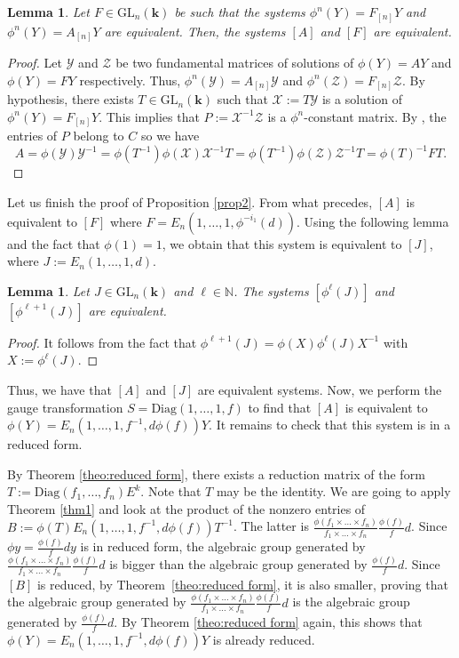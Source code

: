 \documentclass[a4paper,11pt]{amsart}
\newcommand{\GL}{\operatorname{GL}}
\newtheorem{lem}[thm]{Lemma}
\def\k{\mathbf{k}}
\def\GL{\mathrm{GL}}
\begin{document}
\begin{lem}
\label{lem:gaugeTransfoEquiv}
Let $F\in\GL_n(\k)$ be such that the systems $\phi^n(Y) = F_{[n]}Y$ and $\phi^n(Y) = A_{[n]}Y$ are equivalent. 
Then, the systems $[A]$ and $[F]$ are equivalent.
\end{lem}

\begin{proof}
Let $\mathcal{Y}$ and $\mathcal{Z}$ be two fundamental matrices of solutions of $\phi(Y)=AY$ and $\phi(Y)=FY$ respectively. 
Thus, $\phi^n(\mathcal{Y})=A_{[n]}\mathcal{Y}$ and $\phi^n(\mathcal{Z})=F_{[n]}\mathcal{Z}$. By hypothesis,  there exists $T\in\GL_n(\k)$ such that $\mathcal{X}:=T\mathcal{Y}$ is a solution of $\phi^n(Y)=F_{[n]}Y$.
This implies that  $P:=\mathcal{X}^{-1}\mathcal{Z}$ is a $\phi^n$-constant  matrix.  By \cite[Lemma 3.1]{DH21}, the entries of $P$ belong to $C$ so we have 
$$
A = \phi(\mathcal{Y})\mathcal{Y}^{-1} = \phi(T^{-1}) \phi(\mathcal{X})\mathcal{X}^{-1}T= \phi(T^{-1}) \phi(\mathcal{Z})\mathcal{Z}^{-1} T =\phi(T)^{-1} FT .
$$
\end{proof}

Let us finish the proof of Proposition \ref{prop2}.  From what precedes,   $[A]$ is equivalent to $[F]$ where 
$F=E_n (1,\dots, 1, \phi^{-i_1}(d))$. Using the following lemma and the fact that $\phi(1)=1$, we obtain that this system is equivalent to $[J]$, where $J:=E_n (1,\dots, 1, d)$.

\begin{lem}
Let $J\in \GL_n(\k)$ and $\ell\in\mathbb{N}$. The systems $[\phi^{\ell}(J)]$ and $[\phi^{\ell +1}(J)]$ are equivalent.
\end{lem}
\begin{proof}
    It follows from the fact that $\phi^{\ell+1}(J) = \phi(X)\phi^{\ell}(J) X^{-1}$ with $X:=\phi^{\ell}(J)$.
\end{proof}

Thus, we have that $[A]$ and $[J]$ are equivalent systems. 
Now, we perform the gauge transformation $S=\mathrm{Diag}(1,\ldots,1,f)$ to find that $[A]$ is equivalent to $\phi(Y)=E_n (1,\dots, 1,f^{-1}, d\phi(f))Y$.  It remains to check that this system is in a reduced form.  


By Theorem \ref{theo:reduced form},  there exists a reduction matrix of the form 
 $T:= \mathrm{Diag}(f_1,\dots, f_n)E^k$.  Note that $T$ may be the identity.  We are going to apply Theorem \ref{thm1} and look at the product of the nonzero entries of  $B:=\phi(T)E_n (1,\dots, 1,f^{-1}, d\phi(f))T^{-1}$. The latter  is $\frac{\phi(f_1\times \dots \times f_n) }{f_1\times \dots \times f_n}\frac{\phi(f)}{f}d$.  Since $\phi y=\frac{\phi(f)}{f}dy$ is in reduced form,  the algebraic group generated by $\frac{\phi(f_1\times \dots \times f_n) }{f_1\times \dots \times f_n}\frac{\phi(f)}{f}d$ is bigger than the algebraic group generated by $\frac{\phi(f)}{f}d$. Since $[B]$ is reduced, by Theorem~\ref{theo:reduced form},  it is also smaller, proving that the algebraic group generated by $\frac{\phi(f_1\times \dots \times f_n) }{f_1\times \dots \times f_n}\frac{\phi(f)}{f}d$ is the algebraic group generated by $\frac{\phi(f)}{f}d$.  By Theorem \ref{theo:reduced form} again, this shows that $\phi(Y)=E_n (1,\dots, 1,f^{-1}, d\phi(f))Y$ is already reduced.
\end{document}
